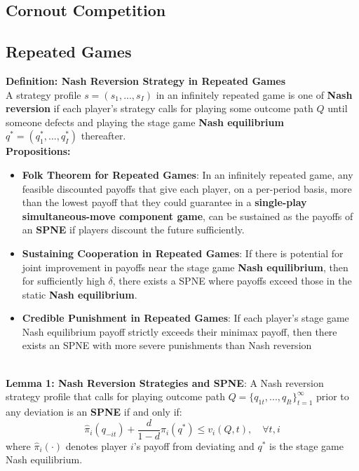 \documentclass{article}
\begin{document}
\subsection{Cornout Competition}

\subsection{Repeated Games}

\textbf{Definition: Nash Reversion Strategy in Repeated Games} \\
A strategy profile $s = (s_1, ..., s_I)$ in an infinitely repeated game is one of \textbf{Nash reversion} if each player’s strategy calls for playing some outcome path $Q$ until someone defects and playing the stage game \textbf{Nash equilibrium} $q^* = (q^*_1, ..., q^*_I)$ thereafter.
\\

\textbf{Propositions:}
\begin{itemize}
    \item \textbf{Folk Theorem for Repeated Games}: In an infinitely repeated game, any feasible discounted payoffs that give each player, on a per-period basis, more than the lowest payoff that they could guarantee in a \textbf{single-play simultaneous-move component game}, can be sustained as the payoffs of an \textbf{SPNE} if players discount the future sufficiently.

    \item \textbf{Sustaining Cooperation in Repeated Games}: If there is potential for joint improvement in payoffs near the stage game \textbf{Nash equilibrium}, then for sufficiently high $\delta$, there exists a SPNE where payoffs exceed those in the static \textbf{Nash equilibrium}. 
    
    \item \textbf{Credible Punishment in Repeated Games}: If each player’s stage game Nash equilibrium payoff strictly exceeds their minimax payoff, then there exists an SPNE with more severe punishments than Nash reversion 
\end{itemize}\\

\noindent \textbf{Lemma 1: Nash Reversion Strategies and SPNE}: A Nash reversion strategy profile that calls for playing outcome path $Q = \{q_{1t} , ..., q_{It}\}_{t=1}^{\infty}$ prior to any deviation is an \textbf{SPNE} if and only if:
\[
\hat{\pi}_i(q_{-it}) + \frac{d}{1 - d} \pi_i(q^*) \leq v_i(Q, t), \quad \forall t, i
\]
where $\hat{\pi}_i(\cdot)$ denotes player $i$’s payoff from deviating and $q^*$ is the stage game Nash equilibrium.
\end{document}
